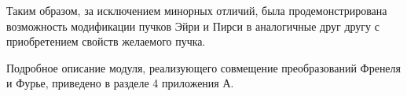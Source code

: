 {%
%
%
%
%
%

    Таким образом, за исключением минорных отличий, была продемонстрирована возможность модификации пучков Эйри и
    Пирси в аналогичные друг другу с приобретением свойств желаемого пучка.

    Подробное описание модуля, реализующего совмещение преобразований Френеля и Фурье, приведено в разделе 4 приложения А.

    }
    \newpage
